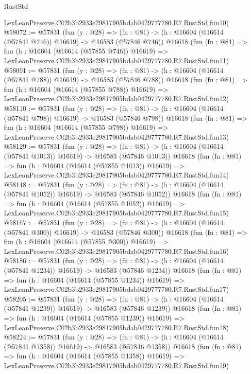 \begin{lexlean}{RustStd}
\begin{coremodule}
    LexLeanPreserve.C02b3b2933e29817905bdab0429777780.R7.RustStd.fun10)
@58072 := @57831
    (fun (y : @28) =>
    (fn : @81) -> (h : @16604 (@16614 (@57841 @746)) @16619) -> @16583 (@57846 @746))
    @16618
    (fun (fn : @81) =>
    fun (h : @16604 (@16614 (@57855 @746)) @16619) =>
    LexLeanPreserve.C02b3b2933e29817905bdab0429777780.R7.RustStd.fun11)
@58091 := @57831
    (fun (y : @28) =>
    (fn : @81) -> (h : @16604 (@16614 (@57841 @788)) @16619) -> @16583 (@57846 @788))
    @16618
    (fun (fn : @81) =>
    fun (h : @16604 (@16614 (@57855 @788)) @16619) =>
    LexLeanPreserve.C02b3b2933e29817905bdab0429777780.R7.RustStd.fun12)
@58110 := @57831
    (fun (y : @28) =>
    (fn : @81) -> (h : @16604 (@16614 (@57841 @798)) @16619) -> @16583 (@57846 @798))
    @16618
    (fun (fn : @81) =>
    fun (h : @16604 (@16614 (@57855 @798)) @16619) =>
    LexLeanPreserve.C02b3b2933e29817905bdab0429777780.R7.RustStd.fun13)
@58129 := @57831
    (fun (y : @28) =>
    (fn : @81) -> (h : @16604 (@16614 (@57841 @1013)) @16619) -> @16583 (@57846 @1013))
    @16618
    (fun (fn : @81) =>
    fun (h : @16604 (@16614 (@57855 @1013)) @16619) =>
    LexLeanPreserve.C02b3b2933e29817905bdab0429777780.R7.RustStd.fun14)
@58148 := @57831
    (fun (y : @28) =>
    (fn : @81) -> (h : @16604 (@16614 (@57841 @1052)) @16619) -> @16583 (@57846 @1052))
    @16618
    (fun (fn : @81) =>
    fun (h : @16604 (@16614 (@57855 @1052)) @16619) =>
    LexLeanPreserve.C02b3b2933e29817905bdab0429777780.R7.RustStd.fun15)
@58167 := @57831
    (fun (y : @28) =>
    (fn : @81) -> (h : @16604 (@16614 (@57841 @300)) @16619) -> @16583 (@57846 @300))
    @16618
    (fun (fn : @81) =>
    fun (h : @16604 (@16614 (@57855 @300)) @16619) =>
    LexLeanPreserve.C02b3b2933e29817905bdab0429777780.R7.RustStd.fun16)
@58186 := @57831
    (fun (y : @28) =>
    (fn : @81) -> (h : @16604 (@16614 (@57841 @1234)) @16619) -> @16583 (@57846 @1234))
    @16618
    (fun (fn : @81) =>
    fun (h : @16604 (@16614 (@57855 @1234)) @16619) =>
    LexLeanPreserve.C02b3b2933e29817905bdab0429777780.R7.RustStd.fun17)
@58205 := @57831
    (fun (y : @28) =>
    (fn : @81) -> (h : @16604 (@16614 (@57841 @1239)) @16619) -> @16583 (@57846 @1239))
    @16618
    (fun (fn : @81) =>
    fun (h : @16604 (@16614 (@57855 @1239)) @16619) =>
    LexLeanPreserve.C02b3b2933e29817905bdab0429777780.R7.RustStd.fun18)
@58224 := @57831
    (fun (y : @28) =>
    (fn : @81) -> (h : @16604 (@16614 (@57841 @1358)) @16619) -> @16583 (@57846 @1358))
    @16618
    (fun (fn : @81) =>
    fun (h : @16604 (@16614 (@57855 @1358)) @16619) =>
    LexLeanPreserve.C02b3b2933e29817905bdab0429777780.R7.RustStd.fun19)

\end{coremodule}
\end{lexlean}
